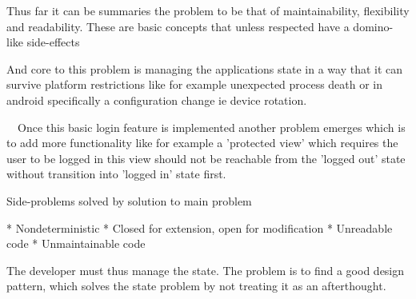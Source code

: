 Thus far it can be summaries the problem to be that of maintainability, flexibility and readability.
These are basic concepts that unless respected have a domino-like side-effects 

And core to this problem is managing the applications state in a way that it can survive platform
restrictions like for example unexpected process death or in android specifically a configuration change
ie device rotation.

~~Once this basic login feature is implemented another problem emerges which is to add more functionality
like for example a 'protected view' which requires the user to be logged in 
this view should not be reachable from the 'logged out' state without
transition into 'logged in' state first.~~

Side-problems solved by solution to main problem




* Nondeterministic
* Closed for extension, open for modification
* Unreadable code
* Unmaintainable code


The developer must thus manage the state. The problem is to find a good design pattern, 
which solves the state problem by not treating it as an afterthought. 



